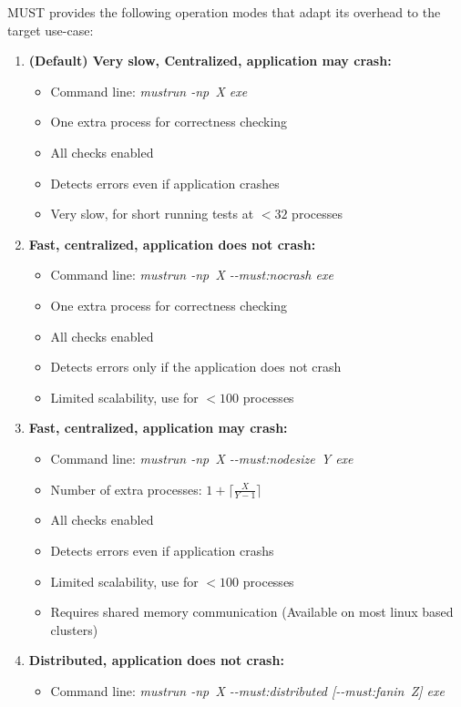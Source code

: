 \documentclass[english]{scrartcl}
\begin{document}
MUST provides the following operation modes that adapt its overhead to the
target use-case:
\begin{enumerate}
  \item \textbf{(Default) Very slow, Centralized, application may crash:}
  \begin{itemize}
    \item Command line: \emph{mustrun \mbox{-np X} exe}
    \item One extra process for correctness checking
    \item All checks enabled
    \item Detects errors even if application crashes
    \item Very slow, for short running tests at $<32$ processes
  \end{itemize}
  \item \textbf{Fast, centralized, application does not crash:}
  \begin{itemize}
    \item Command line: \emph{mustrun \mbox{-np X} \mbox{-{}-must:nocrash} exe}
    \item One extra process for correctness checking
    \item All checks enabled
    \item Detects errors only if the application does not crash %
    \item Limited scalability, use for $<100$ processes 
  \end{itemize}
  \item \textbf{Fast, centralized, application may crash:}
  \begin{itemize}
    \item Command line: \emph{mustrun \mbox{-np X} \mbox{-{}-must:nodesize Y} exe}
    \item Number of extra processes: $1+\lceil{}\frac{X}{Y-1}\rceil{}$
    \item All checks enabled
    \item Detects errors even if application crashs
    \item Limited scalability, use for $<100$ processes
    \item Requires shared memory communication (Available on most linux based
    clusters) 
  \end{itemize}
  \item \textbf{Distributed, application does not crash:}
  \begin{itemize}
    \item Command line: \emph{mustrun \mbox{-np X} \mbox{-{}-must:distributed} [\mbox{-{}-must:fanin Z}] exe}

\end{itemize}
\end{enumerate}
\end{document}
